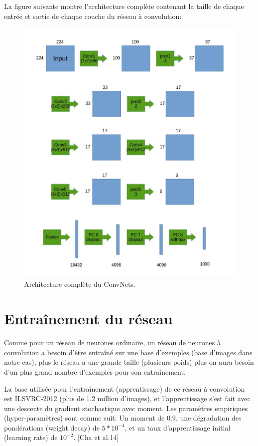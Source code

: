 	La figure suivante montre l'architecture complète contenant la taille de chaque entrée et sortie de chaque couche du réseau à convolution:

\begin{figure}[H]
	\centering
		\includegraphics[width=6in]{Figures/architectureVGG.jpg}
	\caption[An Electron]{Architecture complète du ConvNets.}
	\label{fig:Electron}
\end{figure}



\section{Entraînement du réseau}
	Comme pour un réseau de neurones ordinaire, un réseau de neurones à convolution a besoin d'être entraîné sur une base d'exemples (base d'images dans notre cas), plus le réseau a une grande taille (plusieurs poids) plus on aura besoin d'un plus grand nombre d'exemples pour son entraînement. 
	
	La base utilisée pour l’entraînement (apprentissage) de ce réseau à convolution est ILSVRC-2012 (plus de 1.2 million d'images), et l'apprentissage s'est fait avec une descente du gradient stochastique avec moment. Les paramètres empiriques (hyper-paramètres) sont comme suit: Un moment de $0.9$, une dégradation des pondérations (weight decay) de $5*10^{-4}$, et un taux d'apprentissage initial (learning rate) de $10^{-2}$. [Cha et al.14]
	
